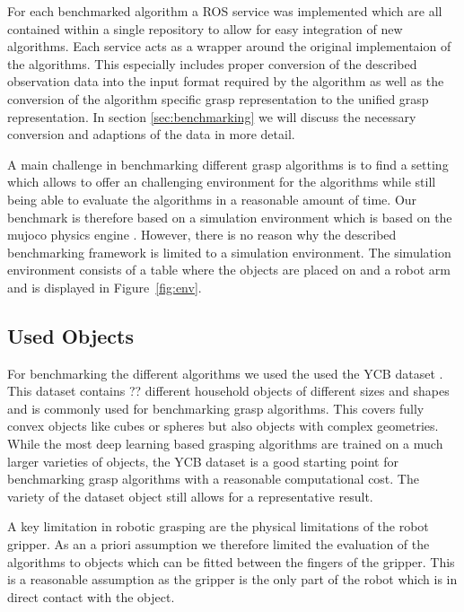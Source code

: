 For each benchmarked algorithm a ROS service was implemented which are all contained within a single repository to allow for easy integration of new algorithms.
Each service acts as a wrapper around the original implementaion of the algorithms.
This especially includes proper conversion of the described observation data into the input format required by the algorithm as well as the conversion of
the algorithm specific grasp representation to the unified grasp representation.
In section \ref{sec:benchmarking} we will discuss the necessary conversion and adaptions of the data in more detail.

A main challenge in benchmarking different grasp algorithms is to find a setting which allows to offer an challenging environment for the algorithms while
still being able to evaluate the algorithms in a reasonable amount of time.
Our benchmark is therefore based on a simulation environment which is based on the mujoco physics engine \cite{}.
However, there is no reason why the described benchmarking framework is limited to a simulation environment.
The simulation environment consists of a table where the objects are placed on and a robot arm and is displayed in Figure~\ref{fig:env}.


\subsection{Used Objects}
For benchmarking the different algorithms we used the used the YCB dataset \cite{}.
This dataset contains ?? different household objects of different sizes and shapes and is commonly used for benchmarking grasp algorithms.
This covers fully convex objects like cubes or spheres but also objects with complex geometries.
While the most deep learning based grasping algorithms are trained on a much larger varieties of objects, the YCB dataset is a good starting point for
benchmarking grasp algorithms with a reasonable computational cost.
The variety of the dataset object still allows for a representative result.

A key limitation in robotic grasping are the physical limitations of the robot gripper.
As an a priori assumption we therefore limited the evaluation of the algorithms to objects which can be fitted between the fingers of the gripper.
This is a reasonable assumption as the gripper is the only part of the robot which is in direct contact with the object.


